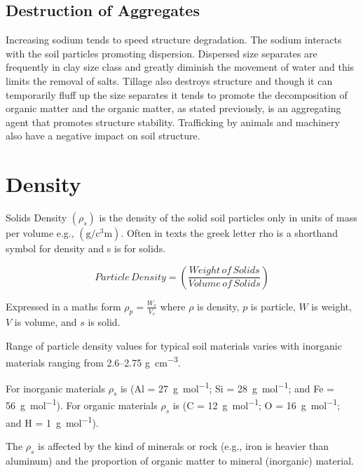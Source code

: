 \documentclass{book}
\begin{document}
\subsection{Destruction of Aggregates}
    
Increasing sodium tends to speed structure degradation. The sodium interacts with the soil particles promoting dispersion. Dispersed size separates are frequently in clay size class and greatly diminish the movement of water and this limits the removal of salts. Tillage also destroys structure and though it can temporarily fluff up the size separates it tends to promote the decomposition of organic matter and the organic matter, as stated previously, is an aggregating agent that promotes structure stability. Trafficking by animals and machinery also have a negative impact on soil structure.
    
\section{Density}
\label{density}
    
Solids Density $\left(\rho_s\right)$ is the density of the solid soil particles only in units of mass per volume e.g., $\left(\unit{\gram\per\cubic\centi\metre}\right)$. Often in texts the greek letter rho  is a shorthand symbol for density and s is for solids.

\begin{equation}
    Particle\,Density = \left(\frac{Weight\,of\,Solids}{Volume\,of\,Solids}\right)   
\end{equation}

Expressed in a maths form $\rho_p =\frac{W_s}{V_s}$ where $\rho$ is density, $p$ is particle, $W$ is weight, $V$ is volume, and $s$ is solid.

Range of particle density values for typical soil materials varies with inorganic materials ranging from \numrange{2.6}{2.75} \unit{\gram\per\cubic\centi\metre}.

For inorganic materials $\rho_s$ is  (Al = \qty[per-mode = symbol]{27}{\gram\per\mole}; Si =  \qty[per-mode = symbol]{28}{\gram\per\mole}; and Fe = \qty[per-mode = symbol]{56}{\gram\per\mole}). For organic materials $\rho_s$ is  (C = \qty[per-mode = symbol]{12}{\gram\per\mole}; O = \qty[per-mode = symbol]{16}{\gram\per\mole}; and H = \qty[per-mode = symbol]{1}{\gram\per\mole}).

The $\rho_s$ is affected by the kind of minerals or rock (e.g., iron is heavier than aluminum) and the proportion of organic matter to mineral (inorganic) material.
\end{document}
